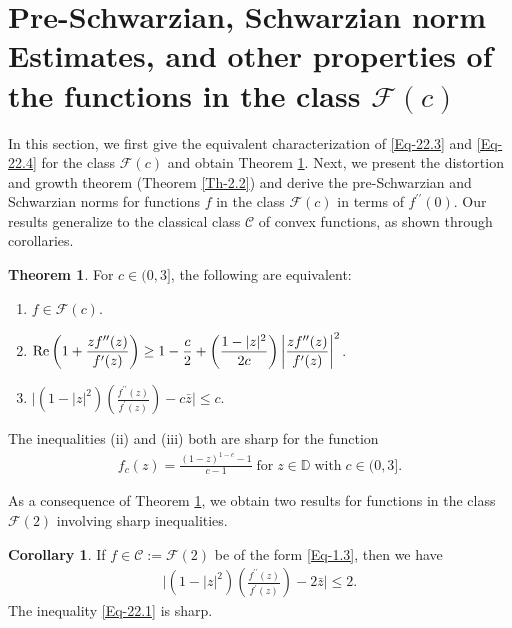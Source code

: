 \documentclass[a4paper,12pt]{amsart}
\theoremstyle{plain}
\theoremstyle{definition}
\newtheorem{cor}{Corollary}[section]
\newtheorem{thm}{Theorem}[section]
\theoremstyle{plain}
\newcounter {own}
\begin{document}
\section{\bf{Pre-Schwarzian, Schwarzian norm Estimates, and other properties of the functions in the class $\mathcal{F}(c)$}}
In this section, we first give the equivalent characterization of \eqref{Eq-22.3} and \eqref{Eq-22.4} for the class $\mathcal{F}(c)$ and obtain Theorem \ref{Th-2.1}. Next, we present the distortion and growth theorem (Theorem \ref{Th-2.2}) and derive the pre-Schwarzian and Schwarzian norms for functions $f$ in the class  $\mathcal{F}(c)$ in terms of $f^{\prime\prime}(0)$. Our results generalize to the classical class $\mathcal{C}$ of convex functions, as shown through corollaries. 
\begin{thm}\label{Th-2.1} For $c\in(0,3]$, the following are equivalent:
	\begin{enumerate}
		\item[{(i)}] $f\in\mathcal{F}(c)$.\vspace{2mm}
		
		\item[{(ii)}] $\displaystyle
			{\rm Re  }\left(1+\frac{zf^{\prime\prime}(z)}{f^{\prime}(z)}\right)\geq1-\frac{c}{2}+\left(\frac{1-|z|^2}{2c}\right)\bigg|\frac{zf^{\prime\prime}(z)}{f^{\prime}(z)}\bigg|^2$.\vspace{2mm}
		
		\item[{(iii)}] $\displaystyle\bigg|	(1-|z|^2)\left(\frac{f^{\prime\prime}(z)}{f^{\prime}(z)}\right)-c\bar{z}\bigg|\leq c.
		$
	\end{enumerate} The inequalities {(ii)} and {(iii)} both are sharp for the function
	\begin{align}\label{Eq-22.11}
		f_{c}(z)=\frac{(1-z)^{1-c}-1}{c-1}\; \mbox{for}\; z\in\mathbb{D}\; \mbox{with}\; c\in(0,3].
	\end{align}
\end{thm}
As a consequence of Theorem \ref{Th-2.1}, we obtain two results for functions in the class $\mathcal{F}(2)$ involving sharp inequalities.
\begin{cor}\label{Cor-2.1}
	If $f\in \mathcal{C} := \mathcal{F}(2)$ be of the form \eqref{Eq-1.3}, then we have
	\begin{align}\label{Eq-22.1}
		\bigg|	(1-|z|^2)\left(\frac{f^{\prime\prime}(z)}{f^{\prime}(z)}\right)-2\bar{z}\bigg|\leq 2.
	\end{align}
	The inequality \eqref{Eq-22.1} is sharp. 
\end{cor}
\end{document}
